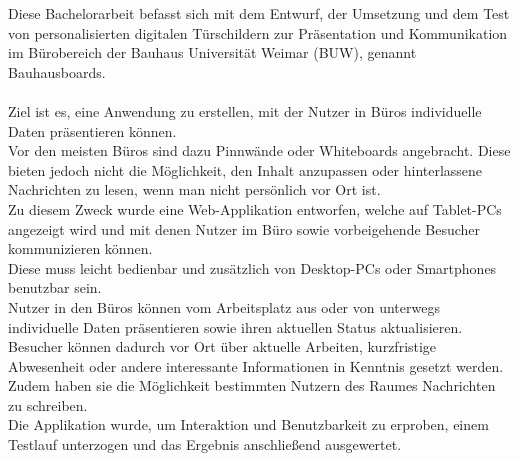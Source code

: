 Diese Bachelorarbeit befasst sich mit dem Entwurf, der Umsetzung und dem Test von personalisierten
digitalen Türschildern zur Präsentation und Kommunikation im Bürobereich der Bauhaus Universität Weimar (BUW), genannt Bauhausboards.
\\\\
Ziel ist es, eine Anwendung zu erstellen, mit der Nutzer in Büros individuelle Daten präsentieren können.
\\
Vor den meisten Büros sind dazu Pinnwände oder Whiteboards angebracht.
Diese bieten jedoch nicht die Möglichkeit, den Inhalt anzupassen oder hinterlassene Nachrichten zu lesen, wenn man nicht persönlich vor Ort ist.
\\
Zu diesem Zweck wurde eine Web-Applikation entworfen, welche auf Tablet-PCs angezeigt wird und mit denen Nutzer im Büro sowie vorbeigehende Besucher kommunizieren können.
\\
Diese muss leicht bedienbar und zusätzlich von Desktop-PCs oder Smartphones benutzbar sein.
\\
Nutzer in den Büros können vom Arbeitsplatz aus oder von unterwegs individuelle Daten präsentieren sowie ihren aktuellen Status aktualisieren.
\\
Besucher können dadurch vor Ort über aktuelle Arbeiten, kurzfristige Abwesenheit oder andere interessante Informationen in Kenntnis gesetzt werden.
Zudem haben sie die Möglichkeit bestimmten Nutzern des Raumes Nachrichten zu schreiben.
\\
Die Applikation wurde, um Interaktion und Benutzbarkeit zu erproben, einem Testlauf unterzogen und das Ergebnis anschließend ausgewertet.